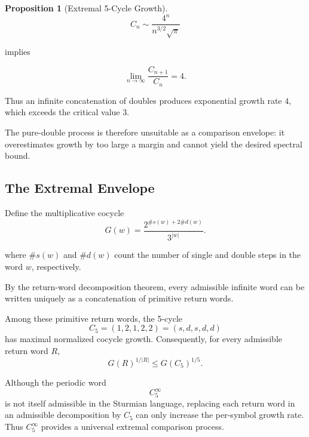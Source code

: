 \documentclass[12pt, oneside]{article}
\numberwithin{equation}{section}
\theoremstyle{definition}
\newtheorem{proposition}{Proposition}[section]
\theoremstyle{plain}
\theoremstyle{remark}
\begin{document}
\begin{proposition}[Extremal 5-Cycle Growth]




\[
C_n
\sim
\frac{4^n}{n^{3/2}\sqrt{\pi}}
\]

implies

\[
\lim_{n\to\infty}
\frac{C_{n+1}}{C_n}
=
4.
\]

Thus an infinite concatenation of doubles produces exponential growth
rate \(4\), which exceeds the critical value \(3\).

The pure-double process is therefore unsuitable as a comparison
envelope: it overestimates growth by too large a margin and cannot
yield the desired spectral bound.




\subsection{The Extremal Envelope}

Define the multiplicative cocycle
\[
G(w)
=
\frac{2^{\#s(w)+2\#d(w)}}{3^{|w|}}.
\]

where \(\#s(w)\) and \(\#d(w)\) count the number of single and double steps
in the word \(w\), respectively.

By the return-word decomposition theorem, every admissible infinite word
can be written uniquely as a concatenation of primitive return words.

Among these primitive return words, the 5-cycle
\[
C_5=(1,2,1,2,2)=(s,d,s,d,d)
\]
has maximal normalized cocycle growth. Consequently,
for every admissible return word $R$,
\[
G(R)^{1/|R|}
\le
G(C_5)^{1/5}.
\]

Although the periodic word
\[
C_5^\infty
\]
is not itself admissible in the Sturmian language, replacing each return
word in an admissible decomposition by $C_5$ can only increase the
per-symbol growth rate. Thus $C_5^\infty$ provides a universal extremal
comparison process.


\end{proposition}
\end{document}
